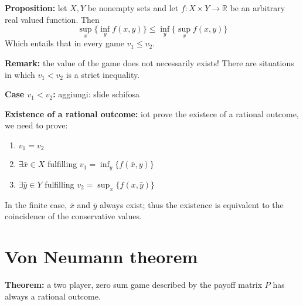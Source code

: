 \bigskip
\noindent \textbf{Proposition:} let $X,Y$ be nonempty sets and let 
$f: X \times Y \rightarrow \mathbb{R}$ be an arbitrary real valued function. 
Then
\[
	\sup_x \{ \inf_y f(x,y)\} \leq \inf_y \{ \sup_x f(x,y)\}
\]
Which entails that in every game $v_1 \leq v_2$.

\noindent \textbf{Remark:} the value of the game does not necessarily exists! 
There are situations in which $v_1 < v_2$ is a strict inequality.

\bigskip
\noindent \textbf{Case $v_1 < v_2$:} {\huge aggiungi: slide schifosa}

\bigskip
\noindent \textbf{Existence of a rational outcome:} iot prove the existece of 
a rational outcome, we need to prove:
\begin{enumerate}
	\item $v_1 = v_2$
	\item $\exists \bar{x} \in X$ fulfilling $v_1 = \inf_y\{f(\bar{x},y)\}$
	\item $\exists \bar{y} \in Y$ fulfilling $v_2 = \sup_x\{f(x,\bar{y})\}$
\end{enumerate}
In the finite case, $\bar{x}$ and $\bar{y}$ always exist; thus the existence is 
equivalent to the coincidence of the conservative values.

\section{Von Neumann theorem}
\noindent \textbf{Theorem:} a two player, zero sum game described by 
the payoff matrix $P$ has always a rational outcome.

%
